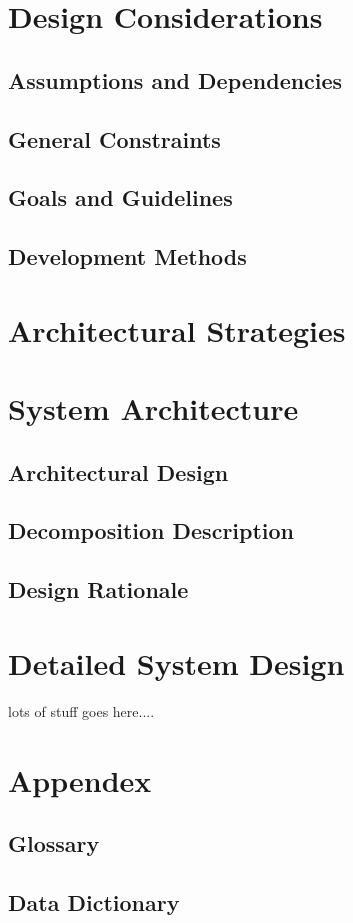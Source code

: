 \documentclass[12pt, letterpaper]{article}
\begin{document}
\section{Design Considerations}
  \subsection{Assumptions and Dependencies}
  \subsection{General Constraints}
  \subsection{Goals and Guidelines}
  \subsection{Development Methods}

\section{Architectural Strategies}
\section{System Architecture}
  \subsection{Architectural Design}
  \subsection{Decomposition Description}
  \subsection{Design Rationale}

\section{Detailed System Design}
  lots of stuff goes here....

\section{Appendex}
  \subsection{Glossary}
  \subsection{Data Dictionary}

{}

\end{document}
